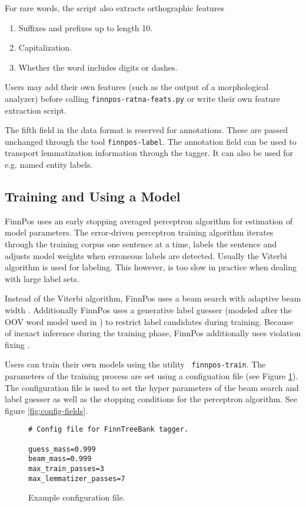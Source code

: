 \documentclass{llncs}
\begin{document}
For rare words, the script also extracts orthographic features

\begin{enumerate}
\item Suffixes and prefixes up to length 10.
\item Capitalization.
\item Whether the word includes digits or dashes.
\end{enumerate}

Users may add their own features (such as the output of a
morphological analyzer) before calling {\tt finnpos-ratna-feats.py} or
write their own feature extraction script.

The fifth field in the data format is reserved for annotations. These
are passed unchanged through the tool {\tt finnpos-label}. The
annotation field can be used to transport lemmatization information
through the tagger. It can also be used for e.g. named entity labels.

\subsection{Training and Using a Model}

FinnPos uses an early stopping averaged perceptron algorithm for
estimation of model parameters. The error-driven perceptron training
algorithm iterates through the training corpus one sentence at a time,
labels the sentence and adjusts model weights when erroneous labels
are detected. Usually the Viterbi algorithm \cite{collins/2002} is
used for labeling. This however, is too slow in practice when dealing
with large label sets.

Instead of the Viterbi algorithm, FinnPos uses a beam search with
adaptive beam width \cite{pal/2006}. Additionally FinnPos uses a generative
label guesser (modeled after the OOV word model used in
\cite{brants/2000}) to restrict label candidates during
training. Because of inexact inference during the training phase,
FinnPos additionally uses violation fixing \cite{huang/2012}.

Users can train their own models using the utility {\tt
  finnpos-train}. The parameters of the training process are set using
a configuation file (see Figure \ref{fig:config-file}). The
configuration file is used to set the hyper parameters of the beam
search and label guesser as well as the stopping conditions for the
perceptron algorithm. See figure \ref{fig:config-fields}.

\begin{figure}
\begin{framed}
\begin{verbatim}
# Config file for FinnTreeBank tagger.

guess_mass=0.999
beam_mass=0.999
max_train_passes=3
max_lemmatizer_passes=7
\end{verbatim}
\end{framed}
\caption{Example configuration file.}\label{fig:config-file}
\end{figure}
\end{document}
